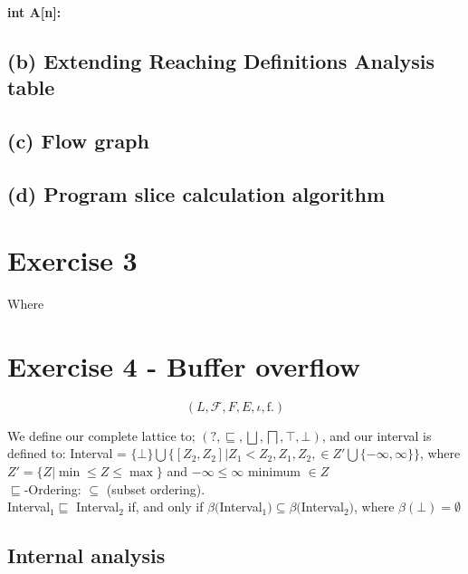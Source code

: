 \documentclass[12pt]{article}
\begin{document}
\paragraph*{int A[n]:}


\subsection*{(b) Extending Reaching Definitions Analysis table}
\subsection*{(c) Flow graph}
\subsection*{(d) Program slice calculation algorithm}
\section*{Exercise 3}

Where 

\section*{Exercise 4 - Buffer overflow}
\begin{equation}
  \left(L, \mathcal{F}, F, E, \iota, \mathrm{f}.  \right)
  \label{eq:monotone_framework}
\end{equation}

We define our complete lattice to; $(?,\sqsubseteq,\bigsqcup, \bigsqcap, \top, \bot )$, and our interval is defined to: Interval = $\{\bot\} \bigcup \{[Z_2, Z_2] | Z_1 < Z_2, Z_1, Z_2, \in Z' \bigcup \{- \infty, \infty \} \} $, where $Z' = \{ Z | \min \leq Z \leq \max \}$ and $ - \infty \leq \infty $ minimum $ \in Z$\\
$\sqsubseteq$-Ordering: $\subseteq$ (subset ordering).\\
Interval$_1 \sqsubseteq $ Interval$_2 $ if, and only if $\beta($Interval$_1) \subseteq \beta($Interval$_2)$, where $\beta(\bot) = \emptyset$ 

\subsection*{Internal analysis}
\end{document}
